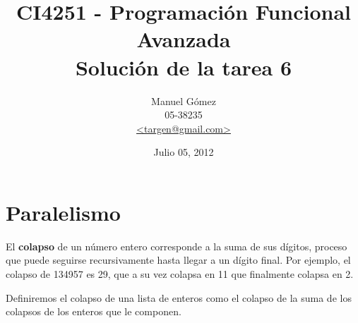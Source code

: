 \documentclass[11pt,fleqn]{article}
\begin{document}
\title{CI4251 - Programación Funcional Avanzada \\
Solución de la tarea 6}

\author{Manuel Gómez\\
05-38235\\
\href{mailto:targen@gmail.com}{<targen@gmail.com>}}

\date{Julio 05, 2012}

\maketitle

\pagebreak

\section{Paralelismo}

El \textbf{colapso} de un número entero corresponde a la suma de
sus dígitos, proceso que puede seguirse recursivamente hasta
llegar a un dígito final. Por ejemplo, el colapso de 134957 es 29,
que a su vez colapsa en 11 que finalmente colapsa en 2.

Definiremos el colapso de una lista de enteros como el colapso
de la suma de los colapsos de los enteros que le componen.
\end{document}
